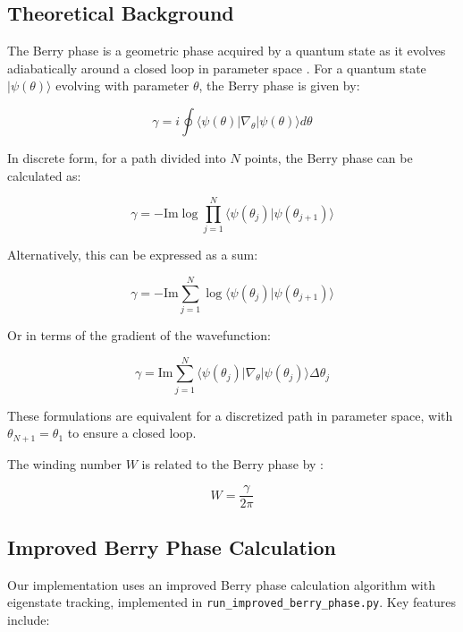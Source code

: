 \documentclass{article}
\begin{document}
\subsection{Theoretical Background}

The Berry phase is a geometric phase acquired by a quantum state as it evolves adiabatically around a closed loop in parameter space \cite{Bernevig2013, Hasan2010}. For a quantum state $|\psi(\theta)\rangle$ evolving with parameter $\theta$, the Berry phase is given by:

\begin{equation}
\gamma = i \oint \langle \psi(\theta) | \nabla_\theta | \psi(\theta) \rangle d\theta
\end{equation}

In discrete form, for a path divided into $N$ points, the Berry phase can be calculated as:

\begin{equation}
\gamma = -\text{Im} \log \prod_{j=1}^{N} \langle \psi(\theta_j) | \psi(\theta_{j+1}) \rangle
\end{equation}

Alternatively, this can be expressed as a sum:

\begin{equation}
\gamma = -\text{Im} \sum_{j=1}^{N} \log \langle \psi(\theta_j) | \psi(\theta_{j+1}) \rangle
\end{equation}

Or in terms of the gradient of the wavefunction:

\begin{equation}
\gamma = \text{Im} \sum_{j=1}^{N} \langle \psi(\theta_j) | \nabla_\theta | \psi(\theta_j) \rangle \Delta\theta_j
\end{equation}

These formulations are equivalent for a discretized path in parameter space, with $\theta_{N+1} = \theta_1$ to ensure a closed loop.

The winding number $W$ is related to the Berry phase by \cite{Park2011, Liang2015}:

\begin{equation}
W = \frac{\gamma}{2\pi}
\end{equation}

\subsection{Improved Berry Phase Calculation}

Our implementation uses an improved Berry phase calculation algorithm with eigenstate tracking, implemented in \texttt{run\_improved\_berry\_phase.py}. Key features include:
\end{document}
